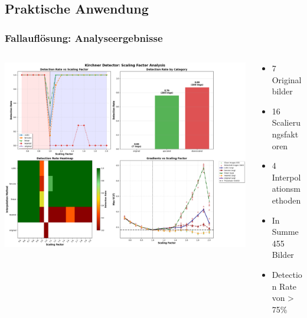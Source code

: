 \documentclass[11pt,t,usepdftitle=false,aspectratio=169]{beamer}
\begin{document}
\subsection{Praktische Anwendung}

\begin{frame}
	\frametitle{Fallauflösung: Analyseergebnisse}
	\begin{columns}[T]
		\begin{column}{0.6\textwidth}
			\includegraphics[width=\textwidth]{images/scaling_analysis_report.png}
		\end{column}
		\begin{column}{0.40\textwidth}
			\begin{itemize}
				\item 7 Originalbilder
				\item 16 Scalierungsfaktoren
				\item 4 Interpolationsmethoden
				\item In Summe 455 Bilder
				\item Detection Rate von > 75\%
			\end{itemize}
		\end{column}
	\end{columns}
\end{frame}
\end{document}
